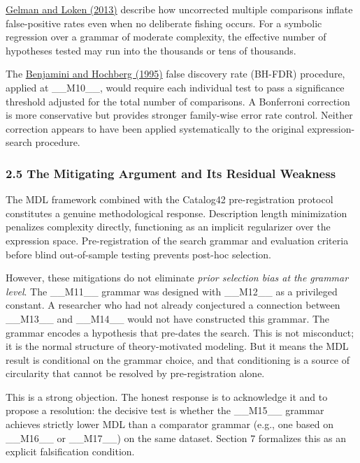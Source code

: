 \href{https://sites.stat.columbia.edu/gelman/research/unpublished/forking.pdf}{Gelman and Loken (2013)} describe how uncorrected multiple comparisons inflate false-positive rates even when no deliberate fishing occurs. For a symbolic regression over a grammar of moderate complexity, the effective number of hypotheses tested may run into the thousands or tens of thousands.

The \href{https://en.wikipedia.org/wiki/Benjamini\%E2\%80\%93Hochberg\_procedure}{Benjamini and Hochberg (1995)} false discovery rate (BH-FDR) procedure, applied at \_\_M10\_\_, would require each individual test to pass a significance threshold adjusted for the total number of comparisons. A Bonferroni correction is more conservative but provides stronger family-wise error rate control. Neither correction appears to have been applied systematically to the original expression-search procedure.

\subsubsection{2.5 The Mitigating Argument and Its Residual Weakness}

The MDL framework combined with the Catalog42 pre-registration protocol constitutes a genuine methodological response. Description length minimization penalizes complexity directly, functioning as an implicit regularizer over the expression space. Pre-registration of the search grammar and evaluation criteria before blind out-of-sample testing prevents post-hoc selection.

However, these mitigations do not eliminate \textit{prior selection bias at the grammar level}. The \_\_M11\_\_ grammar was designed with \_\_M12\_\_ as a privileged constant. A researcher who had not already conjectured a connection between \_\_M13\_\_ and \_\_M14\_\_ would not have constructed this grammar. The grammar encodes a hypothesis that pre-dates the search. This is not misconduct; it is the normal structure of theory-motivated modeling. But it means the MDL result is conditional on the grammar choice, and that conditioning is a source of circularity that cannot be resolved by pre-registration alone.

This is a strong objection. The honest response is to acknowledge it and to propose a resolution: the decisive test is whether the \_\_M15\_\_ grammar achieves strictly lower MDL than a comparator grammar (e.g., one based on \_\_M16\_\_ or \_\_M17\_\_) on the same dataset. Section 7 formalizes this as an explicit falsification condition.

